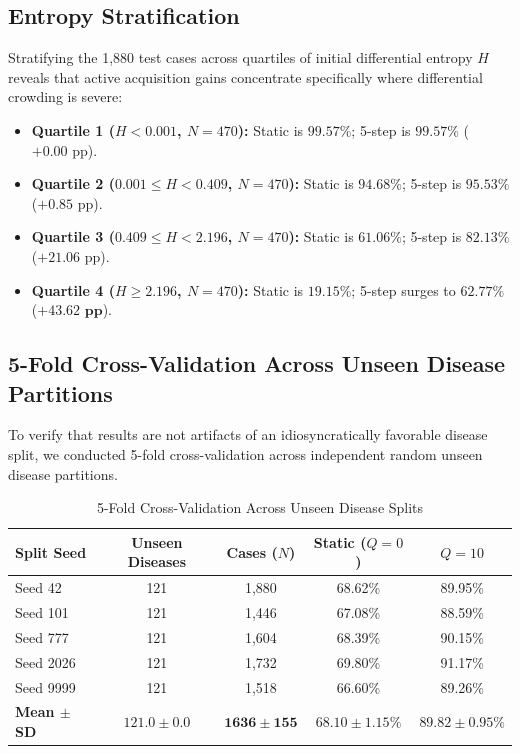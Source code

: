 \documentclass[conference]{IEEEtran}
\begin{document}
\subsection{Entropy Stratification}
Stratifying the 1,880 test cases across quartiles of initial differential entropy $H$ reveals that active acquisition gains concentrate specifically where differential crowding is severe:
\begin{itemize}
    \item \textbf{Quartile 1 ($H < 0.001$, $N=470$):} Static is $99.57\%$; 5-step is $99.57\%$ ($+0.00\text{ pp}$).
    \item \textbf{Quartile 2 ($0.001 \le H < 0.409$, $N=470$):} Static is $94.68\%$; 5-step is $95.53\%$ ($+0.85\text{ pp}$).
    \item \textbf{Quartile 3 ($0.409 \le H < 2.196$, $N=470$):} Static is $61.06\%$; 5-step is $82.13\%$ ($+21.06\text{ pp}$).
    \item \textbf{Quartile 4 ($H \ge 2.196$, $N=470$):} Static is $19.15\%$; 5-step surges to $62.77\%$ ($\mathbf{+43.62\text{ pp}}$).
\end{itemize}

\subsection{5-Fold Cross-Validation Across Unseen Disease Partitions}
To verify that results are not artifacts of an idiosyncratically favorable disease split, we conducted 5-fold cross-validation across independent random unseen disease partitions.

\begin{table}[htbp]
\caption{5-Fold Cross-Validation Across Unseen Disease Splits}
\begin{center}
\begin{tabular}{lcccc}
\toprule
\textbf{Split Seed} & \textbf{Unseen Diseases} & \textbf{Cases ($N$)} & \textbf{Static ($Q=0$)} & \textbf{$Q=10$} \\
\midrule
Seed 42 & 121 & 1,880 & 68.62\% & 89.95\% \\
Seed 101 & 121 & 1,446 & 67.08\% & 88.59\% \\
Seed 777 & 121 & 1,604 & 68.39\% & 90.15\% \\
Seed 2026 & 121 & 1,732 & 69.80\% & 91.17\% \\
Seed 9999 & 121 & 1,518 & 66.60\% & 89.26\% \\
\midrule
\textbf{Mean $\pm$ SD} & $\mathbf{121.0 \pm 0.0}$ & $\mathbf{1636 \pm 155}$ & $\mathbf{68.10 \pm 1.15\%}$ & $\mathbf{89.82 \pm 0.95\%}$ \\
\bottomrule
\end{tabular}
\label{tab:cv}
\end{center}
\end{table}
\end{document}
